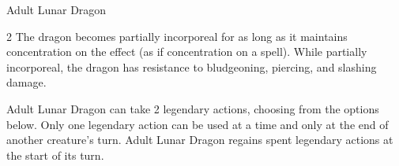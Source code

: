 \documentclass[10pt,a4paper,twoside,bg=print,twocolumn,openany,nodeprecatedcode]{dndbook}
\begin{document}
\begin{DndMonster}[float*=b,width=\textwidth + 8pt]{Adult Lunar Dragon}
\begin{multicols}{2}
The dragon becomes partially incorporeal for as long as it maintains concentration on the effect (as if concentration on a spell). While partially incorporeal, the dragon has resistance to bludgeoning, piercing, and slashing damage.

Adult Lunar Dragon can take 2 legendary actions, choosing from the options below. Only one legendary action can be used at a time and only at the end of another creature's turn. Adult Lunar Dragon regains spent legendary actions at the start of its turn.

\begin{DndMonsterLegendaryActions}
\end{DndMonsterLegendaryActions}
\end{multicols}
\end{DndMonster}
\end{document}
